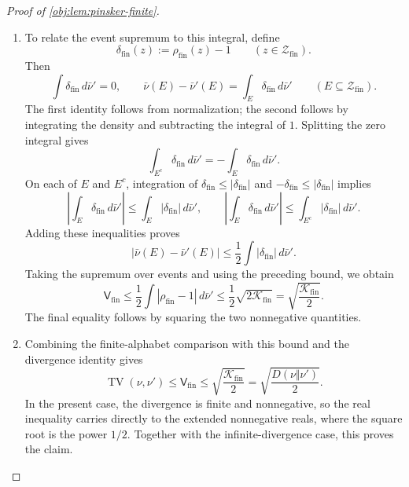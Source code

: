\begin{proof}[Proof of \cref{obj:lem:pinsker-finite}]
\begin{enumerate}
\item To relate the event supremum to this integral, define
\[
\delta_{\mathrm{fin}}(z):=\rho_{\mathrm{fin}}(z)-1
\qquad(z\in\mathcal Z_{\mathrm{fin}}).
\]
Then
\[
\int\delta_{\mathrm{fin}}\,d\bar\nu'=0,
\qquad
\bar\nu(E)-\bar\nu'(E)
=\int_E\delta_{\mathrm{fin}}\,d\bar\nu'
\qquad(E\subseteq\mathcal Z_{\mathrm{fin}}).
\]
The first identity follows from normalization; the second follows by integrating the density and subtracting the integral of \(1\). Splitting the zero integral gives
\[
\int_{E^c}\delta_{\mathrm{fin}}\,d\bar\nu'
=-\int_E\delta_{\mathrm{fin}}\,d\bar\nu'.
\]
On each of \(E\) and \(E^c\), integration of
\(\delta_{\mathrm{fin}}\le|\delta_{\mathrm{fin}}|\) and
\(-\delta_{\mathrm{fin}}\le|\delta_{\mathrm{fin}}|\) implies
\[
\left|\int_E\delta_{\mathrm{fin}}\,d\bar\nu'\right|
\le\int_E|\delta_{\mathrm{fin}}|\,d\bar\nu',
\qquad
\left|\int_E\delta_{\mathrm{fin}}\,d\bar\nu'\right|
\le\int_{E^c}|\delta_{\mathrm{fin}}|\,d\bar\nu'.
\]
Adding these inequalities proves
\[
|\bar\nu(E)-\bar\nu'(E)|
\le\frac12\int|\delta_{\mathrm{fin}}|\,d\bar\nu'.
\]
Taking the supremum over events and using the preceding bound, we obtain
\[
\mathsf V_{\mathrm{fin}}
\le\frac12\int|\rho_{\mathrm{fin}}-1|\,d\bar\nu'
\le\frac12\sqrt{2\mathcal K_{\mathrm{fin}}}
=\sqrt{\frac{\mathcal K_{\mathrm{fin}}}{2}}.
\]
The final equality follows by squaring the two nonnegative quantities.

\item Combining the finite-alphabet comparison with this bound and the divergence identity gives
\[
\operatorname{TV}(\nu,\nu')
\le\mathsf V_{\mathrm{fin}}
\le\sqrt{\frac{\mathcal K_{\mathrm{fin}}}{2}}
=\sqrt{\frac{D(\nu\Vert\nu')}{2}}.
\]
In the present case, the divergence is finite and nonnegative, so the real inequality carries directly to the extended nonnegative reals, where the square root is the power \(1/2\). Together with the infinite-divergence case, this proves the claim.
\end{enumerate}
\end{proof}
